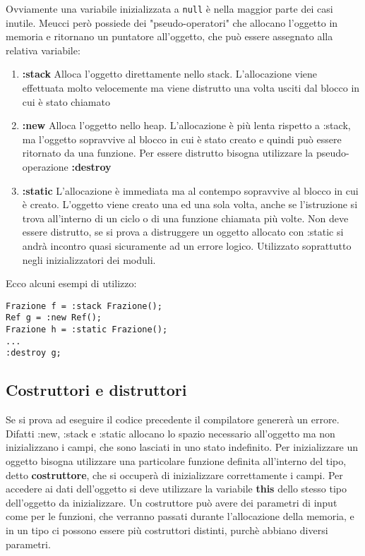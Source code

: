 \documentclass[10pt]{book}%
\newcommand{\e}{\`{e} }
\newcommand{\ac}[1]{\`{#1}}
\newcommand{\code}[1]{\texttt{#1}}
\renewcommand{\emph}[1]{\textbf{#1}}
\newenvironment{codeenv}{
\begin{mdframed}[backgroundcolor=black!20,topline=false,leftline=false,rightline=false,bottomline=false]
}
{\end{mdframed}}
\begin{document}
Ovviamente una variabile inizializzata a \code{null} \e nella maggior parte dei casi inutile. Meucci per\ac o possiede dei "pseudo-operatori" che allocano l'oggetto in memoria e ritornano un puntatore all'oggetto, che pu\ac o essere assegnato alla relativa variabile:
\begin{enumerate}
\item \emph{:stack} Alloca l'oggetto direttamente nello stack. L'allocazione viene effettuata molto velocemente ma viene distrutto una volta usciti dal blocco in cui \e stato chiamato
\item \emph{:new} Alloca l'oggetto nello heap. L'allocazione \e pi\ac u lenta rispetto a :stack, ma l'oggetto sopravvive al blocco in cui \e stato creato e quindi pu\ac o essere ritornato da una funzione. Per essere distrutto bisogna utilizzare la pseudo-operazione \emph{:destroy}
\item \emph{:static} L'allocazione \e immediata ma al contempo sopravvive al blocco in cui \e creato. L'oggetto viene creato una ed una sola volta, anche se l'istruzione si trova all'interno di un ciclo o di una funzione chiamata pi\ac u volte. Non deve essere distrutto, se si prova a distruggere un oggetto allocato con :static si andr\ac a incontro quasi sicuramente ad un errore logico. Utilizzato soprattutto negli inizializzatori dei moduli.
\end{enumerate}
Ecco alcuni esempi di utilizzo:
\begin{codeenv}
\begin{verbatim}
Frazione f = :stack Frazione();
Ref g = :new Ref();
Frazione h = :static Frazione();
...
:destroy g;
\end{verbatim}
\end{codeenv}

\subsection{Costruttori e distruttori}
Se si prova ad eseguire il codice precedente il compilatore generer\ac a un errore. Difatti :new, :stack e :static allocano lo spazio necessario all'oggetto ma non inizializzano i campi, che sono lasciati in uno stato indefinito. Per inizializzare un oggetto bisogna utilizzare una particolare funzione definita all'interno del tipo, detto \emph{costruttore}, che si occuper\ac a di inizializzare correttamente i campi. Per accedere ai dati dell'oggetto si deve utilizzare la variabile \emph{this} dello stesso tipo dell'oggetto da inizializzare. Un costruttore pu\ac o avere dei parametri di input come per le funzioni, che verranno passati durante l'allocazione della memoria, e in un tipo ci possono essere pi\ac u costruttori distinti, purch\ac e abbiano diversi parametri.
\end{document}

